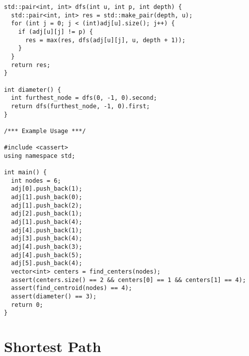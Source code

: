 \begin{lstlisting}
std::pair<int, int> dfs(int u, int p, int depth) {
  std::pair<int, int> res = std::make_pair(depth, u);
  for (int j = 0; j < (int)adj[u].size(); j++) {
    if (adj[u][j] != p) {
      res = max(res, dfs(adj[u][j], u, depth + 1));
    }
  }
  return res;
}

int diameter() {
  int furthest_node = dfs(0, -1, 0).second;
  return dfs(furthest_node, -1, 0).first;
}

/*** Example Usage ***/

#include <cassert>
using namespace std;

int main() {
  int nodes = 6;
  adj[0].push_back(1);
  adj[1].push_back(0);
  adj[1].push_back(2);
  adj[2].push_back(1);
  adj[1].push_back(4);
  adj[4].push_back(1);
  adj[3].push_back(4);
  adj[4].push_back(3);
  adj[4].push_back(5);
  adj[5].push_back(4);
  vector<int> centers = find_centers(nodes);
  assert(centers.size() == 2 && centers[0] == 1 && centers[1] == 4);
  assert(find_centroid(nodes) == 4);
  assert(diameter() == 3);
  return 0;
}
\end{lstlisting}

\section{Shortest Path}
\setcounter{section}{2}
\setcounter{subsection}{0}
